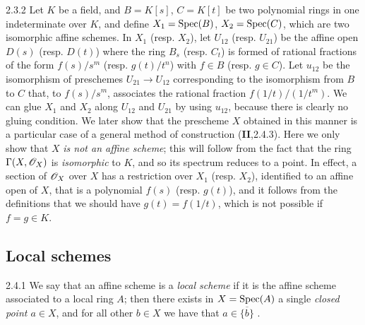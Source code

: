 \documentclass[10pt,oneside]{book}
\begin{document}
\begin{env}[Example]{2.3.2}
\label{exm-1.2.3.2}
Let $K$ be a field, and $B=K[s]$, $C=K[t]$ be two polynomial rings in one indeterminate over $K$,
and define $X_1={\mathop{\mathrm{Spec}}\nolimits}(B)$, $X_2={\mathop{\mathrm{Spec}}\nolimits}(C)$, which are two isomorphic affine schemes.
In $X_1$ (resp. $X_2$), let $U_{12}$ (resp. $U_{21}$) be the affine open $D(s)$ (resp. $D(t)$) where
the ring $B_s$ (resp. $C_t$) is formed of rational fractions of the form $f(s)/s^m$ (resp. $g(t)/t^n$)
with $f\in B$ (resp. $g\in C$). Let $u_{12}$ be the isomorphism of preschemes $U_{21}\to U_{12}$
corresponding  to the isomorphism from $B$ to $C$ that, to $f(s)/s^m$, associates
the rational fraction $f(1/t)/(1/t^m)$. We can glue $X_1$ and $X_2$ along $U_{12}$ and $U_{21}$ by
using $u_{12}$, because there is clearly no gluing condition. We later show that the prescheme $X$
obtained in this manner is a particular case of a general method of construction (\textbf{II},2.4.3).
Here we only show that $X$ \emph{is not an affine scheme}; this will follow from the fact that the ring
$\Gamma(X,\mathscr{O}_X)$ is \emph{isomorphic} to $K$, and so its spectrum reduces to a point. In effect, a section
of $\mathscr{O}_X$ over $X$ has a restriction over $X_1$ (resp. $X_2$), identified to an affine open of $X$, that
is a polynomial $f(s)$ (resp. $g(t)$), and it follows from the definitions that we should have $g(t)=f(1/t)$,
which is not possible if $f=g\in K$.
\end{env}

\subsection{Local schemes}
\label{1-schemes-2.4}

\begin{env}{2.4.1}
\label{env-1.2.4.1}
We say that an affine scheme is a \emph{local scheme} if
it is the affine scheme associated to a local ring $A$; then there exists in
$X={\mathop{\mathrm{Spec}}\nolimits}(A)$ a single \emph{closed point $a\in X$}, and for all other $b\in X$
we have that $a\in\overline{\{b\}}$ .
\end{env}
    
\end{document}
